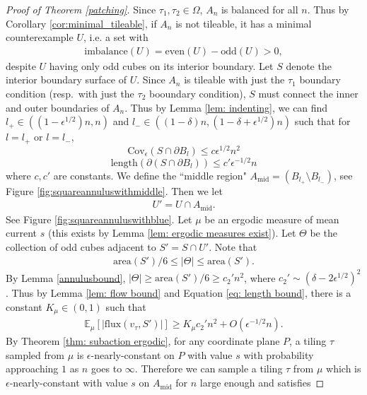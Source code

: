 \documentclass[11pt]{article}
\theoremstyle{remark}
\theoremstyle{definition}
\newcommand{\m}[1]{\mathbb{#1}}
\begin{document}
\begin{proof}[Proof of Theorem \ref{patching}]
    Since $\tau_1,\tau_2\in \Omega$, $A_n$ is balanced for all $n$. Thus by Corollary \ref{cor:minimal_tileable}, if $A_n$ is not tileable, it has a minimal counterexample $U$, i.e. a set with 
    \begin{align*}
        \text{imbalance}(U)=\text{even}(U)-\text{odd}(U)>0,
    \end{align*}
    despite $U$ having only odd cubes on its interior boundary. Let $S$ denote the interior boundary surface of $U$. Since $A_n$ is tileable with just the $\tau_1$ boundary condition (resp.\ with just the $\tau_2$ booundary condition), $S$ must connect the inner and outer boundaries of $A_n$. Thus by Lemma \ref{lem: indenting}, we can find $l_+\in ((1-\epsilon^{1/2})n,n)$ and $l_-\in ((1-\delta)n, (1-\delta+\epsilon^{1/2})n)$ such that for $l=l_+$ or $l=l_-$,
    \begin{equation}\label{eq: covering area}
        \text{Cov}_{\epsilon}(S \cap \partial B_{l}) \leq c \epsilon^{1/2} n^2 
    \end{equation}
    \begin{equation}\label{eq: length bound}
    \text{length}(\partial(S\cap \partial B_l))\leq c' \epsilon^{-1/2} n
    \end{equation}
    where $c,c'$ are constants. We define the ``middle region" $A_{\text{mid}} = (B_{l_+}\setminus B_{l_-})$, see Figure \ref{fig:squareannuluswithmiddle}. Then we let 
    \begin{align*}
        U' = U \cap A_{\text{mid}}.
    \end{align*}
    See Figure \ref{fig:squareannuluswithblue}. Let $\mu$ be an ergodic measure of mean current $s$ (this exists by Lemma \ref{lem: ergodic measures exist}). Let $\Theta$ be the collection of odd cubes adjacent to $S'=S \cap U'$. Note that 
    \begin{align*}
        \text{area}(S')/6 \leq |\Theta| \leq \text{area}(S').
    \end{align*}
    By Lemma \ref{annulusbound}, $|\Theta|\geq \text{area}(S')/6 \geq c_2' n^2$, where $c_2'\sim (\delta-2\epsilon^{1/2})^2$. Thus by Lemma \ref{lem: flow bound} and Equation \eqref{eq: length bound}, there is a constant $K_\mu\in(0,1)$ such that
    \begin{align*}
        \m E_{\mu}[|\text{flux}(v_\tau,S')|]\geq K_{\mu}c_2' n^2 + O(\epsilon^{-1/2} n). 
    \end{align*}
    By Theorem \ref{thm: subaction ergodic}, for any coordinate plane $P$, a tiling $\tau$ sampled from $\mu$ is $\epsilon$-nearly-constant on $P$ with value $s$ with probability approaching $1$ as $n$ goes to $\infty$. Therefore we can sample a tiling $\tau$ from $\mu$ which is $\epsilon$-nearly-constant with value $s$ on $A_{\text{mid}}$ for $n$ large enough and satisfies 

\end{proof}
\end{document}
